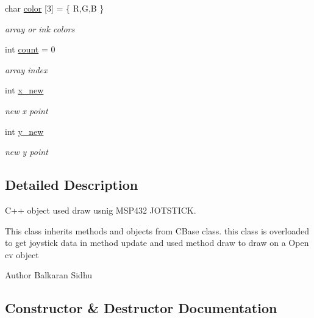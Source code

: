 \begin{DoxyCompactItemize}
char \hyperlink{class_c_sketch_a137fb639e3a0b37951be649bf6beeadf}{color} \mbox{[}3\mbox{]} = \{ \textquotesingle{}R\textquotesingle{},\textquotesingle{}G\textquotesingle{},\textquotesingle{}B\textquotesingle{} \}
\begin{DoxyCompactList}\small\item\em array or ink colors \end{DoxyCompactList}\item 
\hypertarget{class_c_sketch_a6e20224c862d107d07f14a0ae2836b4c}{}\label{class_c_sketch_a6e20224c862d107d07f14a0ae2836b4c} 
int \hyperlink{class_c_sketch_a6e20224c862d107d07f14a0ae2836b4c}{count} = 0
\begin{DoxyCompactList}\small\item\em array index \end{DoxyCompactList}\item 
\hypertarget{class_c_sketch_a96fedda918698e262f189ac180f192fa}{}\label{class_c_sketch_a96fedda918698e262f189ac180f192fa} 
int \hyperlink{class_c_sketch_a96fedda918698e262f189ac180f192fa}{x\+\_\+new}
\begin{DoxyCompactList}\small\item\em new x point \end{DoxyCompactList}\item 
\hypertarget{class_c_sketch_a9a5b969fb28e84f6bebfa5c724d794f4}{}\label{class_c_sketch_a9a5b969fb28e84f6bebfa5c724d794f4} 
int \hyperlink{class_c_sketch_a9a5b969fb28e84f6bebfa5c724d794f4}{y\+\_\+new}
\begin{DoxyCompactList}\small\item\em new y point \end{DoxyCompactList}\end{DoxyCompactItemize}


\subsection{Detailed Description}
C++ object used draw usnig M\+S\+P432 J\+O\+T\+S\+T\+I\+CK. 

This class inherits methods and objects from C\+Base class. this class is overloaded to get joystick data in method update and used method draw to draw on a Open cv object

\begin{DoxyAuthor}{Author}
Balkaran Sidhu 
\end{DoxyAuthor}


\subsection{Constructor \& Destructor Documentation}
\hypertarget{class_c_sketch_a5a822c00631ea5b9402bd76819d772f5}{}\label{class_c_sketch_a5a822c00631ea5b9402bd76819d772f5} 
